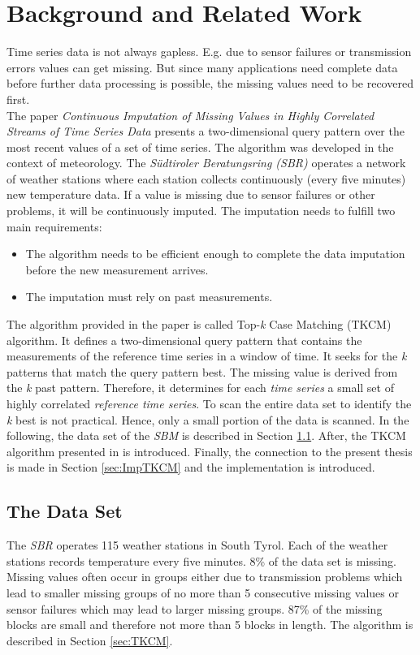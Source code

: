 \documentclass[abstracton,12pt]{scrreprt}
\begin{document}
\chapter{Background and Related Work}
Time series data is not always gapless. E.g. due to sensor failures or transmission errors values can get missing. But since many applications need complete data before further data processing is possible, the missing values need to be recovered first. \\The paper \emph{Continuous Imputation of Missing Values in Highly Correlated Streams of Time Series Data} \cite{BScT} presents a two-dimensional query pattern over the most recent values of a set of time series. The algorithm was developed in the context of meteorology. The \emph{Südtiroler Beratungsring (SBR)} operates a network of weather stations where each station collects continuously (every five minutes) new temperature data. If a value is missing due to sensor failures or other problems, it will be continuously imputed. The imputation needs to fulfill two main requirements: \\
\begin{itemize}  
	\item The algorithm needs to be efficient enough to complete the data imputation before the new measurement arrives. 
	\item The imputation must rely on past measurements.\\
\end{itemize}
The algorithm provided in the paper is called Top-\emph{k} Case Matching (TKCM) algorithm. It defines a two-dimensional query pattern that contains the measurements of the reference time series in a window of time. It seeks for the \emph{k} patterns that match the query pattern best. The missing value is derived from the \emph{k} past pattern. Therefore, it determines for each \emph{time series} a small set of highly correlated \emph{reference time series}. To scan the entire data set to identify the \emph{k} best is not practical. Hence, only a small portion of the data is scanned. In the following, the data set of the \emph{SBM} is described in Section \ref{sec:DS}. After, the TKCM algorithm presented in \cite{BScT} is introduced. Finally, the connection to the present thesis is made in Section \ref{sec:ImpTKCM} and the implementation is introduced. 


\section{The Data Set}
\label{sec:DS}
The \emph{SBR} operates 115 weather stations in South Tyrol. Each of the weather stations records temperature every five minutes. 8\% of the data set is missing. Missing values often occur in groups either due to transmission problems which lead to smaller missing groups of no more than 5 consecutive missing values or sensor failures which may lead to larger missing groups. 87\% of the missing blocks are small and therefore not more than 5 blocks in length. The algorithm is described in Section \ref{sec:TKCM}. 
\end{document}
